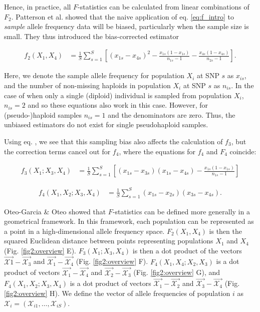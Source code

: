 \documentclass[12pt, letterpaper]{article}
\newcommand{\CX}{\mathcal{X}}
\begin{document}
Hence, in practice, all $F$-statistics can be calculated from linear combinations of $F_2$. Patterson et al. showed that the naive application of eq. \ref{eq:f_intro} to \emph{sample} allele frequency data will be biased, particularly when the sample size is small. They thus introduced the bias-corrected estimator \cite{ patterson_ancient_2012}


\begin{align}\label{eq:f2_correction}
f_2(X_1,X_4) &= \frac{1}{S}\sum_{s=1}^S\left[(x_{1s} - x_{4s})^2 - \frac{x_{1s}(1-x_{1s})}{n_{1s}-1} - \frac{x_{4s}(1-x_{4s})}{n_{2s}-1}\right] \text{.}
\end{align}\label{eq:f2_error}

Here, we denote the sample allele frequency for population $X_i$ at SNP $s$ as $x_{is}$, and the number of non-missing haploids in population $X_i$ at SNP $s$ as $n_{is}$. In the case of when only a single (diploid) individual is sampled from population $X_i$, $n_{is}=2$ and so these equations also work in this case. However, for (pseudo-)haploid samples $n_{is}=1$ and the denominators are zero. Thus, the unbiased estimators do not exist for single pseudohaploid samples.

Using eq. \label{eq:f3_f4}, we see that this sampling bias also affects the calculation of $f_3$,  but the correction terms cancel out for $f_4$, where the equations for $f_4$ and $F_4$ coincide:

\begin{align}\label{eq:f3_correction}
f_3(X_1;X_3,X_4) &=\frac{1}{S} \sum_{s=1}^S\left[(x_{1s} - x_{3s})(x_{1s} - x_{4s}) - \frac{x_{1s}(1-x_{1s})}{n_{1s}-1}\right]
\end{align}\label{eq:f3_error} 

\begin{align}\label{eq:f4_correction}
f_4(X_1,X_2;X_3,X_4) &= \frac{1}{S}\sum_{s=1}^S(x_{1s} - x_{2s})(x_{3s} - x_{4s}) \text{.}
\end{align}\label{eq:f4_error} 

Oteo-Garcia \& Oteo \cite{oteo-garcia_geometrical_2021} showed that $F$-statistics can be defined more generally in a geometrical framework. In this framework, each population can be represented as a point in a high-dimensional allele frequency space. $F_2(X_1, X_4)$ is then the  squared Euclidean distance between points representing populations $X_1$ and $X_4$ (Fig. \ref{fig2:overview} E). $F_3(X_1;X_3,X_4)$ is then a dot product of the vectors $\Vec{\CX1} - \Vec{\CX_3}$ and $\Vec{\CX_1} - \Vec{\CX_4}$ (Fig. \ref{fig2:overview} F). $F_4(X_1,X_4;X_2,X_3)$ is a dot product of vectors $\Vec{\CX_1} - \Vec{\CX_4}$ and $\Vec{\CX_2} - \Vec{\CX_3}$ (Fig. \ref{fig2:overview} G), and $F_4(X_1,X_2;X_3,X_4)$ is a dot product of vectors $\Vec{\CX_1} - \Vec{\CX_2}$ and $\Vec{\CX_3} - \Vec{\CX_4}$ (Fig. \ref{fig2:overview} H).  We define the vector of allele frequencies of population $i$ as $\mathcal{X}_i = (\mathcal{X}_{i1}, \dots, \mathcal{X}_{iS})$. 
\end{document}
